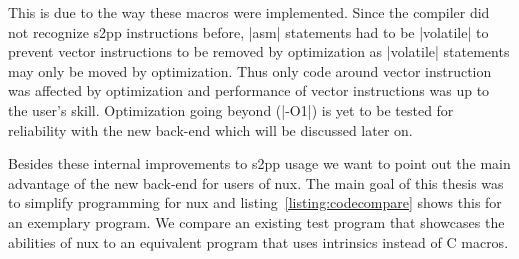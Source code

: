 This is due to the way these macros were implemented.
Since the compiler did not recognize s2pp instructions before, |asm| statements had to be |volatile| to prevent vector instructions to be removed by optimization as |volatile| statements may only be moved by optimization.
Thus only code around vector instruction was affected by optimization and performance of vector instructions was up to the user's skill.
Optimization going beyond (|-O1|) is yet to be tested for reliability with the new back-end which will be discussed later on.

Besides these internal improvements to s2pp usage we want to point out the main advantage of the new back-end for users of nux.
The main goal of this thesis was to simplify programming for nux and listing~\ref{listing:codecompare} shows this for an exemplary program.
We compare an existing test program that showcases the abilities of nux to an equivalent program that uses intrinsics instead of C macros.




